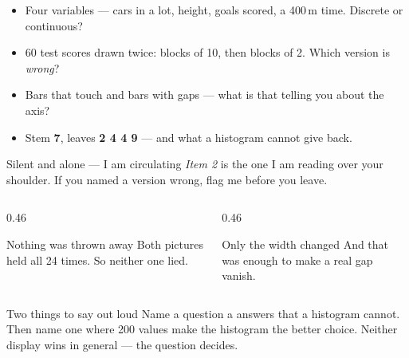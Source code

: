 \documentclass[aspectratio=169, 11pt]{beamer}
\begin{document}
\begin{frame}[t, plain]
  \begin{itemize}\setlength{\itemsep}{7pt}
    \item Four variables --- cars in a lot, height, goals scored, a 400\,m time. Discrete or
          continuous?
    \item 60 test scores drawn twice: blocks of 10, then blocks of 2. Which version is
          \emph{wrong}?
    \item Bars that touch and bars with gaps --- what is that telling you about the axis?
    \item Stem \textbf{7}, leaves \textbf{2 4 4 9} --- and what a histogram cannot give back.
  \end{itemize}
  \begin{block}{Silent and alone --- I am circulating}
    \emph{Item 2} is the one I am reading over your shoulder. If you named a version wrong,
    flag me before you leave.
  \end{block}
\end{frame}

\begin{frame}[t, plain]
  \vspace{6pt}
  \begin{columns}[t]
    \begin{column}{0.46\textwidth}
      \begin{block}{Nothing was thrown away}
        Both pictures held all 24 times. So neither one lied.
      \end{block}
    \end{column}
    \begin{column}{0.46\textwidth}
      \begin{block}{Only the width changed}
        And that was enough to make a real gap vanish.
      \end{block}
    \end{column}
  \end{columns}
  \vspace{14pt}
  \begin{block}{Two things to say out loud}
    Name a question a  answers that a histogram cannot. Then name one where
    200 values make the histogram the better choice. Neither display wins in general --- the
    question decides.
  \end{block}
\end{frame}
\end{document}
